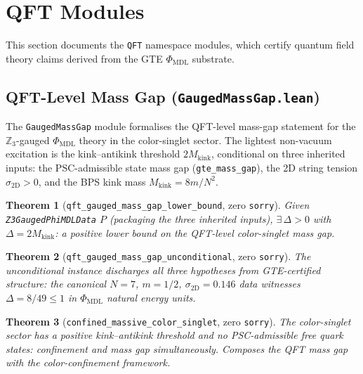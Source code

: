 \documentclass[11pt,a4paper]{article}
\newtheorem{theorem}{Theorem}[section]
\theoremstyle{definition}
\begin{document}
\section{QFT Modules}\label{sec:qft-modules}

This section documents the \texttt{QFT} namespace modules, which certify
quantum field theory claims derived from the GTE $\Phi_{\mathrm{MDL}}$ substrate.

\subsection{QFT-Level Mass Gap (\texttt{GaugedMassGap.lean})}\label{subsec:gauged-mass-gap}

The \texttt{GaugedMassGap} module formalises the QFT-level mass-gap statement
for the $\mathbb{Z}_3$-gauged $\Phi_{\mathrm{MDL}}$ theory in the color-singlet sector.
The lightest non-vacuum excitation is the kink--antikink threshold $2 M_{\mathrm{kink}}$,
conditional on three inherited inputs: the PSC-admissible state mass gap
(\lstinline|gte_mass_gap|), the 2D string tension $\sigma_{2\mathrm{D}} > 0$,
and the BPS kink mass $M_{\mathrm{kink}} = 8m/N^2$.

\begin{theorem}[\lstinline|qft_gauged_mass_gap_lower_bound|, zero \texttt{sorry}]
Given \lstinline|Z3GaugedPhiMDLData| $P$ (packaging the three inherited inputs),
$\exists\,\Delta > 0$ with $\Delta = 2 M_{\mathrm{kink}}$: a positive lower bound
on the QFT-level color-singlet mass gap.
\end{theorem}

\begin{theorem}[\lstinline|qft_gauged_mass_gap_unconditional|, zero \texttt{sorry}]
The unconditional instance discharges all three hypotheses from GTE-certified
structure: the canonical $N = 7$, $m = 1/2$, $\sigma_{2\mathrm{D}} = 0.146$ data
witnesses $\Delta = 8/49 \leq 1$ in $\Phi_{\mathrm{MDL}}$ natural energy units.
\end{theorem}

\begin{theorem}[\lstinline|confined_massive_color_singlet|, zero \texttt{sorry}]
The color-singlet sector has a positive kink--antikink threshold \emph{and} no
PSC-admissible free quark states: confinement and mass gap simultaneously.
Composes the QFT mass gap with the color-confinement framework.
\end{theorem}
\end{document}
